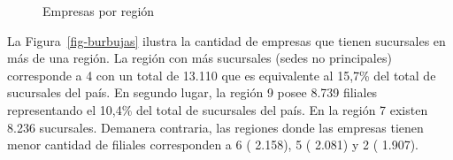 \documentclass[
  11pt,
]{article}
\begin{document}
\begin{figure}[H]

\caption{\label{fig-mapa}Empresas por región}


\end{figure}%

\newpage

La Figura~\ref{fig-burbujas} ilustra la cantidad de empresas que tienen
sucursales en más de una región. La región con más sucursales (sedes no
principales) corresponde a 4 con un total de 13.110 que es equivalente
al 15,7\% del total de sucursales del país. En segundo lugar, la región
9 posee 8.739 filiales representando el 10,4\% del total de sucursales
del país. En la región 7 existen 8.236 sucursales. Demanera contraria,
las regiones donde las empresas tienen menor cantidad de filiales
corresponden a 6 ( 2.158), 5 ( 2.081) y 2 ( 1.907).
\end{document}
